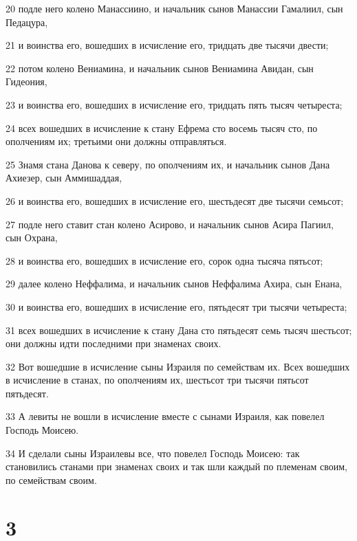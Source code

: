 \par 20 подле него колено Манассиино, и начальник сынов Манассии Гамалиил, сын Педацура,
\par 21 и воинства его, вошедших в исчисление его, тридцать две тысячи двести;
\par 22 потом колено Вениамина, и начальник сынов Вениамина Авидан, сын Гидеония,
\par 23 и воинства его, вошедших в исчисление его, тридцать пять тысяч четыреста;
\par 24 всех вошедших в исчисление к стану Ефрема сто восемь тысяч сто, по ополчениям их; третьими они должны отправляться.
\par 25 Знамя стана Данова к северу, по ополчениям их, и начальник сынов Дана Ахиезер, сын Аммишаддая,
\par 26 и воинства его, вошедших в исчисление его, шестьдесят две тысячи семьсот;
\par 27 подле него ставит стан колено Асирово, и начальник сынов Асира Пагиил, сын Охрана,
\par 28 и воинства его, вошедших в исчисление его, сорок одна тысяча пятьсот;
\par 29 далее колено Неффалима, и начальник сынов Неффалима Ахира, сын Енана,
\par 30 и воинства его, вошедших в исчисление его, пятьдесят три тысячи четыреста;
\par 31 всех вошедших в исчисление к стану Дана сто пятьдесят семь тысяч шестьсот; они должны идти последними при знаменах своих.
\par 32 Вот вошедшие в исчисление сыны Израиля по семействам их. Всех вошедших в исчисление в станах, по ополчениям их, шестьсот три тысячи пятьсот пятьдесят.
\par 33 А левиты не вошли в исчисление вместе с сынами Израиля, как повелел Господь Моисею.
\par 34 И сделали сыны Израилевы все, что повелел Господь Моисею: так становились станами при знаменах своих и так шли каждый по племенам своим, по семействам своим.

\chapter{3}

